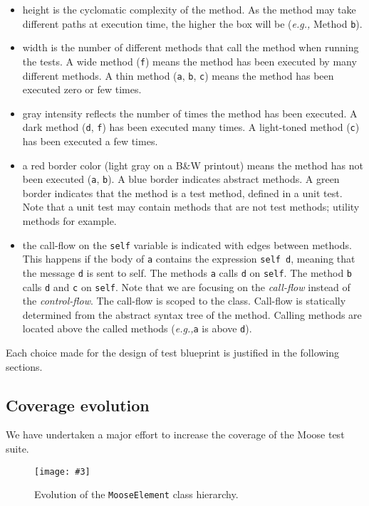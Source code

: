 \documentclass{sig-alternate}
\newcommand{\ct}{\lstinline[backgroundcolor=\color{white},basicstyle=\footnotesize\ttfamily]}
\newcommand{\largefig}[4]{
	\begin{figure*}[#1]
		\centering
		\texttt{[image: \#3]}
		\caption{\label{fig:#3}#4}
	\end{figure*}}
\newcommand{\eg}{\emph{e.g.,}\xspace}
\newcommand{\secref}[1]{Section~\ref{sec:#1}}
\begin{document}
\begin{itemize}
\item height is the cyclomatic complexity of the method. As the method may take different paths at execution time, the higher the box will be (\eg Method \ct{b}).
\item width is the number of different methods that call the method when running the tests. A wide method (\ct{f}) means the method has been executed by many different methods. A thin method (\ct{a}, \ct{b}, \ct{c}) means the method has been executed zero or few times.
\item gray intensity reflects the number of times the method has been executed. A dark method (\ct{d}, \ct{f}) has been executed many times. A light-toned method (\ct{c}) has been executed a few times.
\item a red border color (light gray on a B\&W printout) means the method has not been executed (\ct{a}, \ct{b}). A blue border indicates abstract methods. A green border indicates that the method is a test method, defined in a unit test. Note that a unit test may contain methods that are not test methods; utility methods for example.

\item the call-flow on the \ct{self} variable is indicated with edges between methods. This happens if the body of \ct{a} contains the expression \ct{self d}, meaning that the message \ct{d} is sent to self. The methods \ct{a} calls \ct{d} on \ct{self}. The method \ct{b} calls \ct{d} and \ct{c} on \ct{self}. Note that we are focusing on the \emph{call-flow} instead of the \emph{control-flow}. The call-flow is scoped to the class. Call-flow is statically determined from the abstract syntax tree of the method.  Calling methods are located above the called methods (\eg \ct{a} is above \ct{d}). 
\end{itemize}

Each choice made for the design of test blueprint is justified in the following sections. %

\subsection{Coverage evolution}

We have undertaken a major effort to increase the coverage of the Moose test suite. 

\largefig{}{1}{BigPictureCovered}{Evolution of the \ct{MooseElement} class hierarchy.}
\end{document}
